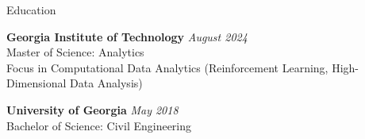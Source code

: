 \documentclass[
	11pt, %
]{resume} %
\begin{document}

\begin{rSection}{Education}

	\textbf{Georgia Institute of Technology} \hfill \textit{August 2024} \\
	Master of Science: Analytics \\
	Focus in Computational Data Analytics (Reinforcement Learning, High-Dimensional Data Analysis)

	\textbf{University of Georgia} \hfill \textit{May 2018} \\
	Bachelor of Science: Civil Engineering

\end{rSection}

\end{document}

